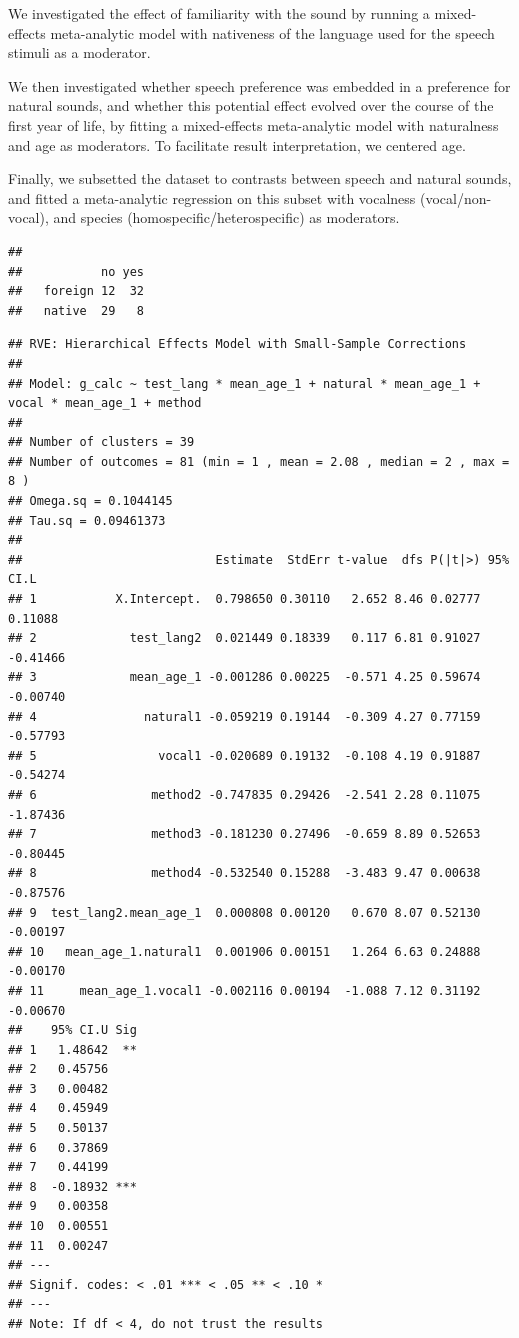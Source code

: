 \documentclass[man]{apa6}
\begin{document}
We investigated the effect of familiarity with the sound by running a
mixed-effects meta-analytic model with nativeness of the language used
for the speech stimuli as a moderator.

We then investigated whether speech preference was embedded in a
preference for natural sounds, and whether this potential effect evolved
over the course of the first year of life, by fitting a mixed-effects
meta-analytic model with naturalness and age as moderators. To
facilitate result interpretation, we centered age.

Finally, we subsetted the dataset to contrasts between speech and
natural sounds, and fitted a meta-analytic regression on this subset
with vocalness (vocal/non-vocal), and species
(homospecific/heterospecific) as moderators.

\begin{verbatim}
##          
##           no yes
##   foreign 12  32
##   native  29   8
\end{verbatim}

\begin{verbatim}
## RVE: Hierarchical Effects Model with Small-Sample Corrections 
## 
## Model: g_calc ~ test_lang * mean_age_1 + natural * mean_age_1 + vocal * mean_age_1 + method 
## 
## Number of clusters = 39 
## Number of outcomes = 81 (min = 1 , mean = 2.08 , median = 2 , max = 8 )
## Omega.sq = 0.1044145 
## Tau.sq = 0.09461373 
## 
##                           Estimate  StdErr t-value  dfs P(|t|>) 95% CI.L
## 1           X.Intercept.  0.798650 0.30110   2.652 8.46 0.02777  0.11088
## 2             test_lang2  0.021449 0.18339   0.117 6.81 0.91027 -0.41466
## 3             mean_age_1 -0.001286 0.00225  -0.571 4.25 0.59674 -0.00740
## 4               natural1 -0.059219 0.19144  -0.309 4.27 0.77159 -0.57793
## 5                 vocal1 -0.020689 0.19132  -0.108 4.19 0.91887 -0.54274
## 6                method2 -0.747835 0.29426  -2.541 2.28 0.11075 -1.87436
## 7                method3 -0.181230 0.27496  -0.659 8.89 0.52653 -0.80445
## 8                method4 -0.532540 0.15288  -3.483 9.47 0.00638 -0.87576
## 9  test_lang2.mean_age_1  0.000808 0.00120   0.670 8.07 0.52130 -0.00197
## 10   mean_age_1.natural1  0.001906 0.00151   1.264 6.63 0.24888 -0.00170
## 11     mean_age_1.vocal1 -0.002116 0.00194  -1.088 7.12 0.31192 -0.00670
##    95% CI.U Sig
## 1   1.48642  **
## 2   0.45756    
## 3   0.00482    
## 4   0.45949    
## 5   0.50137    
## 6   0.37869    
## 7   0.44199    
## 8  -0.18932 ***
## 9   0.00358    
## 10  0.00551    
## 11  0.00247    
## ---
## Signif. codes: < .01 *** < .05 ** < .10 *
## ---
## Note: If df < 4, do not trust the results
\end{verbatim}
\end{document}
